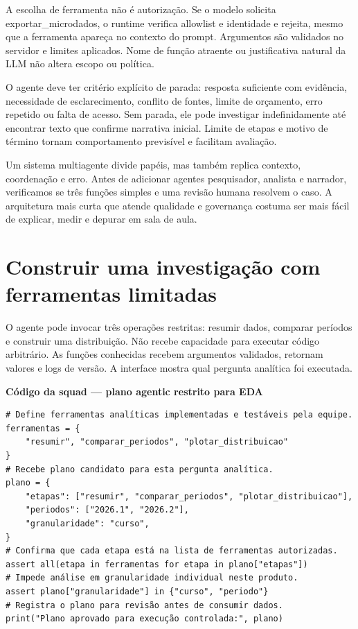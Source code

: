 A escolha de ferramenta não é autorização. Se o modelo solicita exportar\_microdados, o runtime verifica allowlist e identidade e rejeita, mesmo que a ferramenta apareça no contexto do prompt. Argumentos são validados no servidor e limites aplicados. Nome de função atraente ou justificativa natural da LLM não altera escopo ou política.

O agente deve ter critério explícito de parada: resposta suficiente com evidência, necessidade de esclarecimento, conflito de fontes, limite de orçamento, erro repetido ou falta de acesso. Sem parada, ele pode investigar indefinidamente até encontrar texto que confirme narrativa inicial. Limite de etapas e motivo de término tornam comportamento previsível e facilitam avaliação.

Um sistema multiagente divide papéis, mas também replica contexto, coordenação e erro. Antes de adicionar agentes pesquisador, analista e narrador, verificamos se três funções simples e uma revisão humana resolvem o caso. A arquitetura mais curta que atende qualidade e governança costuma ser mais fácil de explicar, medir e depurar em sala de aula.

\section{Construir uma investigação com ferramentas limitadas}

O agente pode invocar três operações restritas: resumir dados, comparar períodos e construir uma distribuição. Não recebe capacidade para executar código arbitrário. As funções conhecidas recebem argumentos validados, retornam valores e logs de versão. A interface mostra qual pergunta analítica foi executada.

\textbf{Código da squad --- plano agentic restrito para EDA}
\begin{verbatim}
# Define ferramentas analíticas implementadas e testáveis pela equipe.
ferramentas = {
    "resumir", "comparar_periodos", "plotar_distribuicao"
}
# Recebe plano candidato para esta pergunta analítica.
plano = {
    "etapas": ["resumir", "comparar_periodos", "plotar_distribuicao"],
    "periodos": ["2026.1", "2026.2"],
    "granularidade": "curso",
}
# Confirma que cada etapa está na lista de ferramentas autorizadas.
assert all(etapa in ferramentas for etapa in plano["etapas"])
# Impede análise em granularidade individual neste produto.
assert plano["granularidade"] in {"curso", "periodo"}
# Registra o plano para revisão antes de consumir dados.
print("Plano aprovado para execução controlada:", plano)
\end{verbatim}

